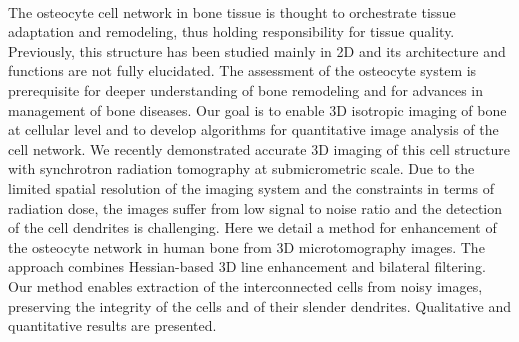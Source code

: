 {{\begin{enumerate}
\\ \aabstract
The osteocyte cell network in bone tissue is thought to orchestrate tissue adaptation and remodeling, thus holding responsibility for tissue quality. Previously, this structure has been studied mainly in 2D and its architecture and functions are not fully elucidated. The assessment of the osteocyte system is prerequisite for deeper understanding of bone remodeling and for advances in management of bone diseases. Our goal is to enable 3D isotropic imaging of bone at cellular level and to develop algorithms for quantitative image analysis of the cell network. We recently demonstrated accurate 3D imaging of this cell structure with synchrotron radiation tomography at submicrometric scale. Due to the limited spatial resolution of the imaging system and the constraints in terms of radiation dose, the images suffer from low signal to noise ratio and the detection of the cell dendrites is challenging. Here we detail a method for enhancement of the osteocyte network in human bone from 3D microtomography images. The approach combines Hessian-based 3D line enhancement and bilateral filtering. Our method enables extraction of the interconnected cells from noisy images, preserving the integrity of the cells and of their slender dendrites. Qualitative and quantitative results are presented. 


\end{enumerate}}}
